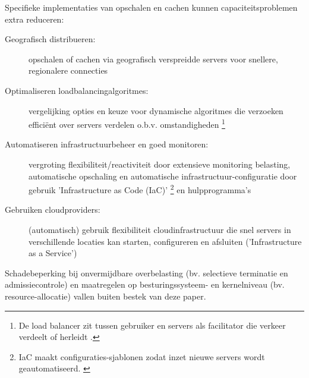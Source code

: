 Specifieke implementaties van opschalen en cachen kunnen capaciteitsproblemen
extra reduceren:

\begin{description}
    \item [Geografisch distribueren:] opschalen of cachen via
    geografisch verspreidde servers voor snellere, regionalere connecties
    \cite{sivasubramanian2007analysis, chenhao2017mitigating,
    colajanni1998dynamic}
    
    \item [Optimaliseren loadbalancingalgoritmes:] vergelijking opties 
    en keuze voor dynamische algoritmes die verzoeken efficiënt over
    servers verdelen o.b.v. omstandigheden
    \cite{mourad1997scalable, zhou2023comparative, amazon2023whatisload}
    \footnote{De load balancer zit tussen gebruiker en servers als
    facilitator die verkeer verdeelt of herleidt \cite{amazon2023whatisload}.}

    \item [Automatiseren infrastructuurbeheer en goed monitoren:] vergroting
    flexibiliteit/reactiviteit door extensieve monitoring belasting,
    automatische opschaling en automatische infrastructuur-configuratie
    door gebruik 'Infrastructure as Code (IaC)'
    \footnote{IaC maakt configuraties-sjablonen zodat inzet nieuwe
    servers wordt geautomatiseerd. \cite{microsoft2023wat}}
    en hulpprogramma's \cite{microsoft2023wat}
    
    \item [Gebruiken cloudproviders:] (automatisch) gebruik flexibiliteit
    cloudinfrastructuur die snel
    servers in verschillende locaties
    kan starten, configureren en afsluiten ('Infrastructure as a Service') 
    \cite{microsoft2023wat, gandhi2018modeldriven, hwang2014scaleout,
    chenhao2017mitigating}

\end{description}

Schadebeperking bij onvermijdbare overbelasting
(bv. selectieve terminatie en admissiecontrole) en maatregelen op
besturingssysteem- en kernelniveau (bv. resource-allocatie)
vallen buiten bestek van deze paper.